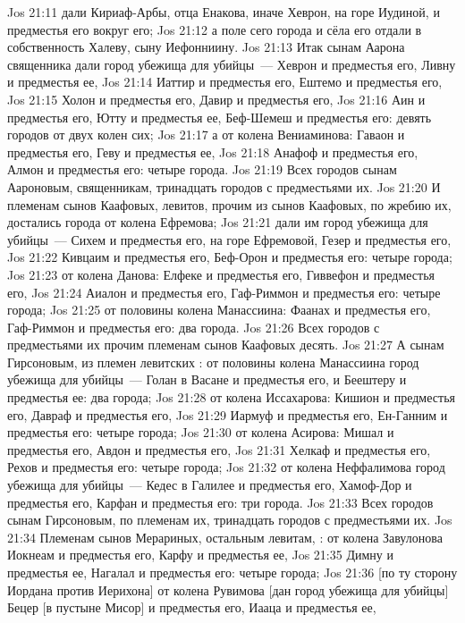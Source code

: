 \vs Jos 21:11 дали Кириаф-Арбы, отца Енакова, иначе Хеврон, на горе Иудиной, и предместья его вокруг его;
\vs Jos 21:12 а поле сего города и сёла его отдали в собственность Халеву, сыну Иефонниину.
\vs Jos 21:13 Итак сынам Аарона священника дали город убежища для убийцы~--- Хеврон и предместья его, Ливну и предместья ее,
\vs Jos 21:14 Иаттир и предместья его, Ештемо и предместья его,
\vs Jos 21:15 Холон и предместья его, Давир и предместья его,
\vs Jos 21:16 Аин и предместья его, Ютту и предместья ее, Беф-Шемеш и предместья его: девять городов от двух колен сих;
\vs Jos 21:17 а от колена Вениаминова: Гаваон и предместья его, Геву и предместья ее,
\vs Jos 21:18 Анафоф и предместья его, Алмон и предместья его: четыре города.
\vs Jos 21:19 Всех городов сынам Аароновым, священникам,  тринадцать городов с предместьями их.
\vs Jos 21:20 И племенам сынов Каафовых, левитов, прочим из сынов Каафовых, по жребию их, достались города от колена Ефремова;
\vs Jos 21:21 дали им город убежища для убийцы~--- Сихем и предместья его, на горе Ефремовой, Гезер и предместья его,
\vs Jos 21:22 Кивцаим и предместья его, Беф-Орон и предместья его: четыре города;
\vs Jos 21:23 от колена Данова: Елфеке и предместья его, Гиввефон и предместья его,
\vs Jos 21:24 Аиалон и предместья его, Гаф-Риммон и предместья его: четыре города;
\vs Jos 21:25 от половины колена Манассиина: Фаанах и предместья его, Гаф-Риммон и предместья его: два города.
\vs Jos 21:26 Всех городов с предместьями их прочим племенам сынов Каафовых  десять.
\vs Jos 21:27 А сынам Гирсоновым, из племен левитских : от половины колена Манассиина город убежища для убийцы~--- Голан в Васане и предместья его, и Беештеру и предместья ее: два города;
\vs Jos 21:28 от колена Иссахарова: Кишион и предместья его, Давраф и предместья его,
\vs Jos 21:29 Иармуф и предместья его, Ен-Ганним и предместья его: четыре города;
\vs Jos 21:30 от колена Асирова: Мишал и предместья его, Авдон и предместья его,
\vs Jos 21:31 Хелкаф и предместья его, Рехов и предместья его: четыре города;
\vs Jos 21:32 от колена Неффалимова город убежища для убийцы~--- Кедес в Галилее и предместья его, Хамоф-Дор и предместья его, Карфан и предместья его: три города.
\vs Jos 21:33 Всех городов сынам Гирсоновым, по племенам их,  тринадцать городов с предместьями их.
\vs Jos 21:34 Племенам сынов Мерариных, остальным левитам, : от колена Завулонова Иокнеам и предместья его, Карфу и предместья ее,
\vs Jos 21:35 Димну и предместья ее, Нагалал и предместья его: четыре города;
\vs Jos 21:36 [по ту сторону Иордана против Иерихона] от колена Рувимова [дан город убежища для убийцы] Бецер [в пустыне Мисор] и предместья его, Иааца и предместья ее,
